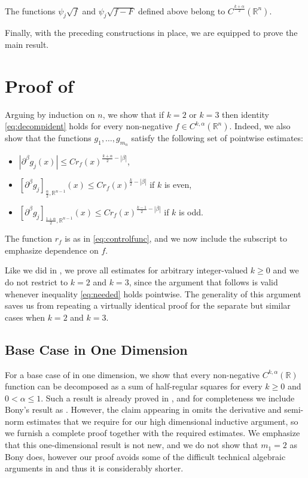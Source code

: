\documentclass[oneside,hidelinks,indentfirst,10pt]{book}
\begin{document}
\begin{cor}\label{cor:theniceone}
The functions \(\psi_j\sqrt{f}\) and \(\psi_j\sqrt{f-F}\) defined above belong to \(C^\frac{k+\alpha}{2}(\mathbb{R}^n)\).
\end{cor}


Finally, with the preceding constructions in place, we are equipped to prove the main result.


\section{Proof of \texorpdfstring{}{}}\label{sec:c3proof}


Arguing by induction on \(n\), we show that if \(k=2\) or \(k=3\) then identity \eqref{eq:decompident} holds for every non-negative \(f\in C^{k,\alpha}(\mathbb{R}^{n})\). Indeed, we also show that the functions \(g_1,\dots,g_{m_n}\) satisfy the following set of pointwise estimates:
\begin{itemize}
    \item[\textit{(1)}] \(|\partial^\beta g_j(x)|\leq Cr_f(x)^{\frac{k+\alpha}{2}-|\beta|}\),
    \item[\textit{(2)}] \([\partial^\beta g_j]_{\frac{\alpha}{2},\mathbb{R}^{n-1}}(x)\leq Cr_f(x)^{\frac{k}{2}-|\beta|}\) if \(k\) is even,
    \item[\textit{(3)}] \([\partial^\beta g_j]_{\frac{1+\alpha}{2},\mathbb{R}^{n-1}}(x)\leq Cr_f(x)^{\frac{k-1}{2}-|\beta|}\) if \(k\) is odd.
\end{itemize}
The function \(r_f\) is as in \eqref{eq:controlfunc}, and we now include the subscript to emphasize dependence on \(f\). 


Like we did in , we prove all estimates for arbitrary integer-valued \(k\geq 0\) and we do not restrict to \(k=2\) and \(k=3\), since the argument that follows is valid whenever inequality \eqref{eq:needed} holds pointwise. The generality of this argument saves us from repeating a virtually identical proof for the separate but similar cases when \(k=2\) and \(k=3\). 


\subsection*{\normalsize Base Case in One Dimension}


For a base case of  in one dimension, we show that every non-negative \(C^{k,\alpha}(\mathbb{R})\) function can be decomposed as a sum of half-regular squares for every \(k\geq 0\) and \(0<\alpha\leq 1\). Such a result is already proved in \cite{Bony2}, and for completeness we include Bony's result as . However, the claim appearing in \cite{Bony2} omits the derivative and semi-norm estimates that we require for our high dimensional inductive argument, so we furnish a complete proof together with the required estimates. We emphasize that this one-dimensional result is not new, and we do not show that \(m_1=2\) as Bony does, however our proof avoids some of the difficult technical algebraic arguments in \cite{Bony2} and thus it is considerably shorter.
\end{document}
